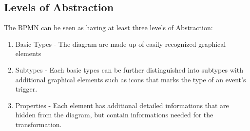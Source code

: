 \subsection{Levels of Abstraction}
The BPMN can be seen as having at least three levels of Abstraction:
\begin{enumerate}
	\item Basic Types - The diagram are made up of easily recognized graphical elements
	\item Subtypes - Each basic types can be further distinguished into subtypes with additional graphical elements such as icons that marks the type of an event's trigger.
	\item Properties - Each element has additional detailed informations that are hidden from the diagram, but contain informations needed for the transformation.
\end{enumerate}


